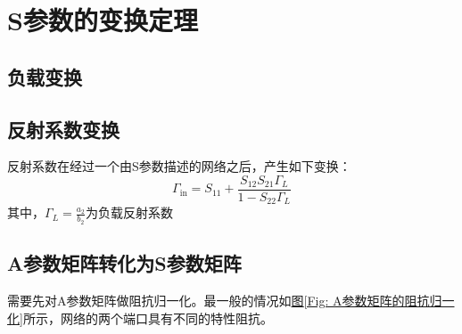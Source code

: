 \section{S参数的变换定理}

    \subsection{负载变换}

    \subsection{反射系数变换}
    反射系数在经过一个由S参数描述的网络之后，产生如下变换：
    \begin{equation}
        \varGamma_\mathrm{in}=S_{11}+\frac{S_{12}S_{21}\varGamma_L}{1-S_{22}\varGamma_L}
    \end{equation}
    其中，$\varGamma_L=\frac{a_2}{b_2}$为负载反射系数    
    \subsection{A参数矩阵转化为S参数矩阵}
    需要先对A参数矩阵做阻抗归一化。最一般的情况如\hyperref[Fig: A参数矩阵的阻抗归一化]{图\ref*{Fig: A参数矩阵的阻抗归一化}}所示，网络的两个端口具有不同的特性阻抗。

